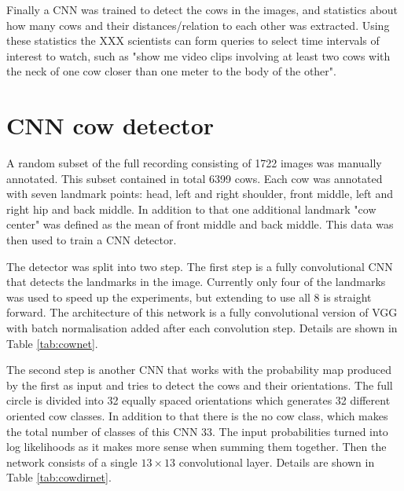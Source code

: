 \documentclass[10pt,a4paper,twocolumn]{article}
\begin{document}
Finally a CNN was trained to detect the cows in the images, and statistics about how many cows and their distances/relation to each other was extracted. Using these statistics the XXX scientists can form queries to select time intervals of interest to watch, such as "show me video clips involving at least two cows with the neck of one cow closer than one meter to the body of the other".

\section{CNN cow detector}

A random subset of the full recording consisting of 1722 images was manually annotated. This subset contained in total 6399 cows. Each cow was annotated with seven landmark points: head, left and right shoulder, front middle, left and right hip and back middle. In addition to that one additional landmark "cow center" was defined as the mean of front middle and back middle. This data was then used to train a CNN detector.

The detector was split into two step. The first step is a fully convolutional CNN that detects the landmarks in the image. Currently only four of the landmarks was used to speed up the experiments, but extending to use all 8 is straight forward. The architecture of this network is a fully convolutional version of VGG \cite{Simonyan14c} with batch normalisation \cite{DBLP:journals/corr/IoffeS15} added after each convolution step. Details are shown in Table \ref{tab:cownet}.

The second step is another CNN that works with the probability map produced by the first as input and tries to detect the cows and their orientations. The full circle is divided into 32 equally spaced orientations which generates 32 different oriented cow classes. In addition to that there is the no cow class, which makes the total number of classes of this CNN 33. The input probabilities turned into log likelihoods as it makes more sense when summing them together. Then the network consists of a single $ 13 \times 13 $ convolutional layer. Details are shown in Table \ref{tab:cowdirnet}.
\end{document}
